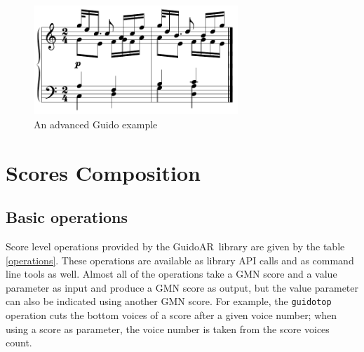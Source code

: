\documentclass[twoside,10pt,a4paper]{article}
\newcommand{\GAR}		{GuidoAR}
\newcommand{\code}[1]	{{\small \texttt{#1}}}
\begin{document}
\begin{figure}[h]
	\centering \includegraphics[width=77mm]{rsrc/4voices}
 \caption{An advanced Guido example}
 \label{advex}
\end{figure}


\section{Scores Composition}

\subsection{Basic operations}
Score level operations provided by the \GAR\ library are given by the table \ref{operations}. These operations are available as library API calls and as command line tools as well. Almost all of the operations take a GMN score and a value parameter as input and produce a GMN score as output, but the value parameter can also be indicated using another GMN score.
For example, the \code{guidotop} operation cuts the bottom voices of a score after a given voice number; when using a score as parameter, the voice number is taken from the score voices count.
\end{document}

